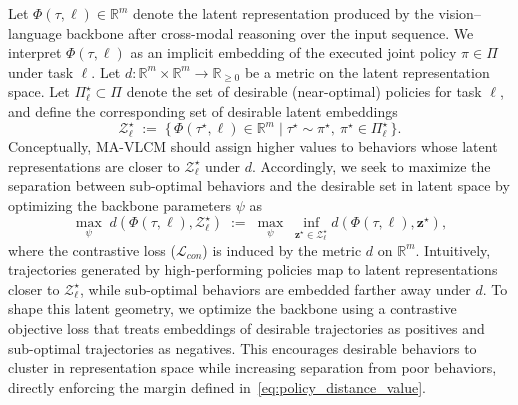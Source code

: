 \documentclass[letterpaper, 10 pt, conference]{ieeeconf}  %
\begin{document}
Let $\Phi(\tau,\ell)\in\mathbb{R}^m$ denote the latent representation produced by the vision--language backbone after cross-modal reasoning over the input sequence. We interpret $\Phi(\tau,\ell)$ as an implicit embedding of the executed joint policy $\pi\in\Pi$ under task $\ell$. Let $d:\mathbb{R}^m\times\mathbb{R}^m\rightarrow\mathbb{R}_{\ge 0}$ be a metric on the latent representation space. Let $\Pi^\star_\ell\subset\Pi$ denote the set of desirable (near-optimal) policies for task $\ell$, and define the corresponding set of desirable latent embeddings
\begin{equation}
\mathcal{Z}^\star_\ell \;:=\; \big\{\, \Phi(\tau^\star,\ell)\in\mathbb{R}^m \;\big|\; \tau^\star \sim \pi^\star,\ \pi^\star\in\Pi^\star_\ell \,\big\}.
\label{eq:optimal_latent_set}
\end{equation}
Conceptually, MA-VLCM should assign higher values to behaviors whose latent representations are closer to $\mathcal{Z}^\star_\ell$ under $d$. Accordingly, we seek to maximize the separation between sub-optimal behaviors and the desirable set in latent space by optimizing the backbone parameters $\psi$ as
\begin{equation}
\max_{\psi}\; d\!\left(\Phi(\tau,\ell),\mathcal{Z}^\star_\ell\right)
\;:=\;
\max_{\psi}\; \inf_{\mathbf{z}^\star\in\mathcal{Z}^\star_\ell}
d\!\left(\Phi(\tau,\ell),\mathbf{z}^\star\right),
\label{eq:policy_distance_value}
\end{equation}
where the contrastive loss ($\mathcal{L}_{con}$) is induced by the metric $d$ on $\mathbb{R}^m$. Intuitively, trajectories generated by high-performing policies map to latent representations closer to $\mathcal{Z}^\star_\ell$, while sub-optimal behaviors are embedded farther away under $d$. To shape this latent geometry, we optimize the backbone using a contrastive objective loss that treats embeddings of desirable trajectories as positives and sub-optimal trajectories as negatives. This encourages desirable behaviors to cluster in representation space while increasing separation from poor behaviors, directly enforcing the margin defined in~\eqref{eq:policy_distance_value}. 
\end{document}
